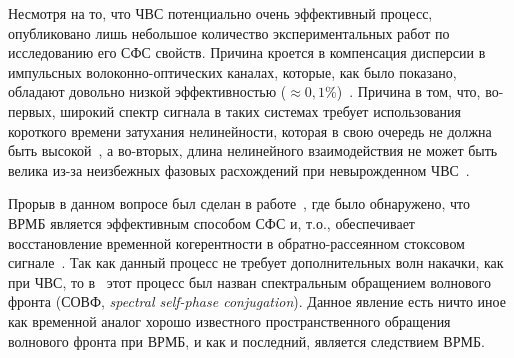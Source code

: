 Несмотря на то, что ЧВС потенциально очень эффективный процесс,
опубликовано лишь небольшое количество экспериментальных работ по
исследованию его СФС свойств. Причина кроется в компенсация
дисперсии в импульсных волоконно-оптических каналах, которые, как
было показано, обладают довольно низкой эффективностью ($\approx 0,1
\%$)~\cite{1319,1320}. Причина в том, что, во-первых, широкий спектр
сигнала в таких системах требует использования короткого времени
затухания нелинейности, которая в свою очередь не должна быть
высокой~\cite{1321}, а во-вторых, длина нелинейного взаимодействия
не может быть велика из-за неизбежных фазовых расхождений при
невырожденном ЧВС~\cite{1322}.


Прорыв в данном вопросе был сделан в работе~\cite{1300}, где было
обнаружено, что ВРМБ является эффективным способом СФС и, т.о.,
обеспечивает восстановление временной когерентности в
обратно-рассеянном стоксовом сигнале~\cite{1310}. Так как данный
процесс не требует дополнительных волн накачки, как при ЧВС, то в~\cite{1300}
этот процесс был назван спектральным обращением
волнового фронта (СОВФ, \emph{spectral self-phase conjugation}).
Данное явление есть ничто иное как временной аналог хорошо
известного пространственного обращения волнового фронта при ВРМБ, и
как и последний, является следствием ВРМБ.

